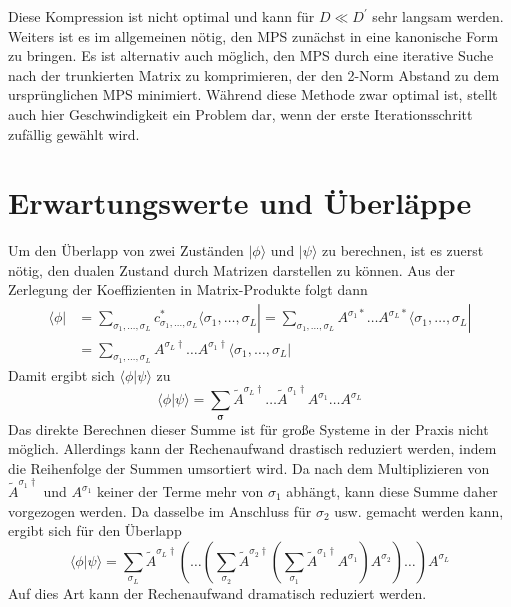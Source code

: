 \documentclass[10pt,a4paper]{report}
\newcommand{\SumIndex}{\sigma_1,\ldots,\sigma_L}
\begin{document}
Diese Kompression ist nicht optimal und kann für $D\ll D^\prime$ sehr langsam werden. Weiters ist es im allgemeinen nötig, den MPS zunächst in eine kanonische Form zu bringen. Es ist alternativ auch möglich, den MPS durch eine iterative Suche nach der trunkierten Matrix zu komprimieren, der den 2-Norm Abstand zu dem ursprünglichen MPS minimiert. Während diese Methode zwar optimal ist, stellt auch hier Geschwindigkeit ein Problem dar, wenn der erste Iterationsschritt zufällig gewählt wird.

\section{Erwartungswerte und Überläppe}\label{MPO}
Um den Überlapp von zwei Zuständen $|\phi\rangle$ und $|\psi\rangle$ zu berechnen, ist es zuerst nötig, den dualen Zustand durch Matrizen darstellen zu können. Aus der Zerlegung der Koeffizienten in Matrix-Produkte folgt dann
\begin{equation}
\begin{split}
\langle\phi|&=\sum_{\SumIndex}c_{\SumIndex}^{\ast}\langle\SumIndex|=\sum_{\SumIndex} A^{\sigma_1\ast}\ldots A^{\sigma_L \ast}\langle\SumIndex|\\
 &= \sum_{\SumIndex}A^{\sigma_L\dagger}\ldots A^{\sigma_1 \dagger}\langle\SumIndex|
\end{split}
\end{equation}
Damit ergibt sich $\langle\phi|\psi\rangle$ zu 
\begin{equation}
\langle\phi|\psi\rangle=\sum_{\bm{\sigma}}\tilde{A}^{\sigma_L \dagger}\ldots\tilde{A}^{\sigma_1 \dagger} A^{\sigma_1}\ldots A^{\sigma_L} 
\end{equation}
Das direkte Berechnen dieser Summe ist für große Systeme in der Praxis nicht möglich. Allerdings kann der Rechenaufwand drastisch reduziert werden, indem die Reihenfolge der Summen umsortiert wird. Da nach dem Multiplizieren von $\tilde{A}^{\sigma_1\dagger}$ und $A^{\sigma_1}$ keiner der Terme mehr von $\sigma_1$ abhängt, kann diese Summe daher vorgezogen werden. Da dasselbe im Anschluss für $\sigma_2$ usw. gemacht werden kann, ergibt sich für den Überlapp
\begin{equation}
\langle\phi|\psi\rangle=\sum_{\sigma_L}\tilde{A}^{\sigma_L\dagger}(\ldots(\sum_{\sigma_2}\tilde{A}^{\sigma_2\dagger}(\sum_{\sigma_1}\tilde{A}^{\sigma_1\dagger}A^{\sigma_1})A^{\sigma_2})\ldots)A^{\sigma_L}
\end{equation}
Auf dies Art kann der Rechenaufwand dramatisch reduziert werden.\\
\end{document}
